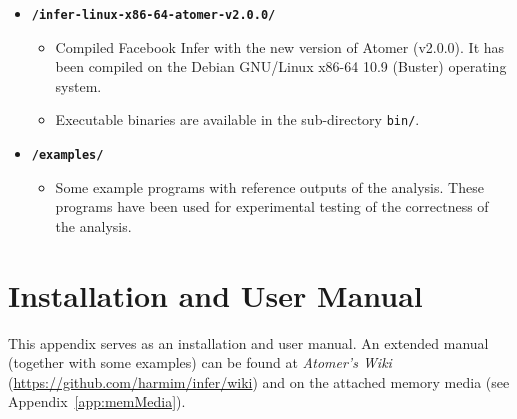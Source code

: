 \begin{itemize}
    \item \texttt{\textbf{/infer-linux-x86-64-atomer-v2.0.0/}}
        \begin{itemize}
            \item Compiled Facebook Infer with the new version of Atomer (v2.0.0). It has been compiled on the Debian GNU/Linux x86-64 10.9 (Buster) operating system.
            
            \item Executable binaries are available in the sub-directory \texttt{bin/}.
        \end{itemize}
    
    \item \texttt{\textbf{/examples/}}
        \begin{itemize}
            \item Some example programs with reference outputs of the analysis. These programs have been used for experimental testing of the correctness of the analysis.
        \end{itemize}
\end{itemize}






\chapter{Installation and User Manual}
\label{app:man}

This appendix serves as an installation and user manual. An extended manual (together with some examples) can be found at \emph{Atomer's Wiki} (\url{https://github.com/harmim/infer/wiki}) and on the attached memory media (see Appendix~\ref{app:memMedia}).

